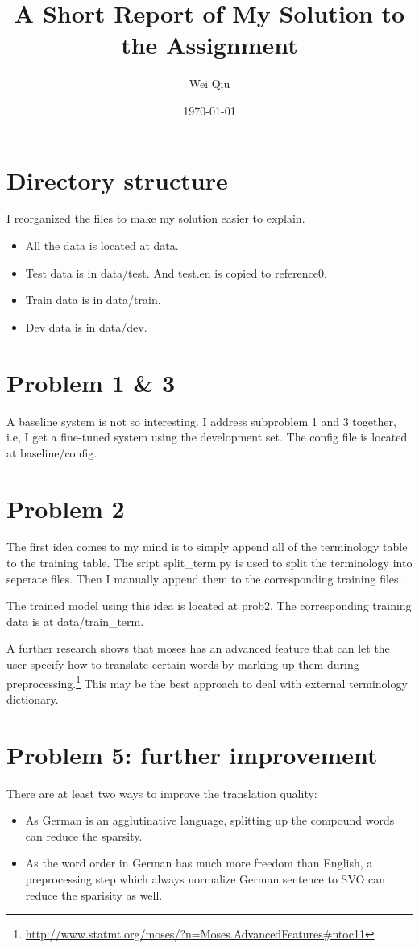 \documentclass[a4paper]{article}
\title{A Short Report of My Solution to the Assignment}
\author{Wei Qiu}
\date{\today}
\begin{document}
\maketitle

\section{Directory structure}
I reorganized the files to make my solution easier to explain.
\begin{itemize}
    \item All the data is located at data.
    \item Test data is in data/test. And test.en is copied to reference0.
    \item Train data is in data/train. 
    \item Dev data is in data/dev.
\end{itemize}

\section{Problem 1 \& 3}

A baseline system is not so interesting.
I address subproblem 1 and 3 together, i.e, I get a fine-tuned system using the development set. 
The config file is located at baseline/config.

\section{Problem 2}
The first idea comes to my mind is to simply append all of the terminology table to the training table. The sript split\_term.py is used to split the terminology into seperate files. Then I manually append them to the corresponding training files.

The trained model using this idea is located at prob2. The corresponding training data is at data/train\_term.

A further research shows that moses has an advanced feature that can let the user specify how to translate certain words by marking up them during preprocessing.\footnote{\url{http://www.statmt.org/moses/?n=Moses.AdvancedFeatures#ntoc11}}
This may be the best approach to deal with external terminology dictionary.




\section{Problem 5: further improvement}
There are at least two ways to improve the translation quality:
\begin{itemize}
    \item As German is an agglutinative language, splitting up the compound words can reduce the sparsity. 
    \item As the word order in German has much more freedom than English, a preprocessing step which always normalize German sentence to SVO can reduce the sparisity as well.
\end{itemize}
\end{document}
